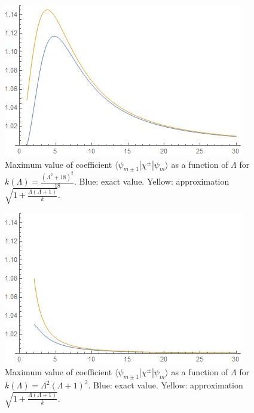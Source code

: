 \begin{figure}[h]
    \centering
    \includegraphics[width = 2\textwidth/3]{images/divFactorwMinimumK.jpg}
    \caption{Maximum value of coefficient $\langle \psi_{m \pm 1} |\chi^\pm | \psi_{m}\rangle$ as a function of $\Lambda$ for $k(\Lambda) = \frac{(\Lambda^2 + 18)^2}{18}$. Blue: exact value. Yellow: approximation $\sqrt{1 + \frac{\Lambda(\Lambda+1)}{k}}$.}
    \label{fig:figureabnChiMinK}
\end{figure}

\begin{figure}[h]
    \centering
    \includegraphics[width = 2\textwidth/3]{images/divFactorwRecommendedK.jpg}
    \caption{Maximum value of coefficient $\langle \psi_{m \pm 1} |\chi^\pm | \psi_{m}\rangle$ as a function of $\Lambda$ for $k(\Lambda) = \Lambda^2(\Lambda+1)^2$. Blue: exact value. Yellow: approximation $\sqrt{1 + \frac{\Lambda(\Lambda+1)}{k}}$.}
    \label{fig:figureabnChiRecommendedK}
\end{figure}

